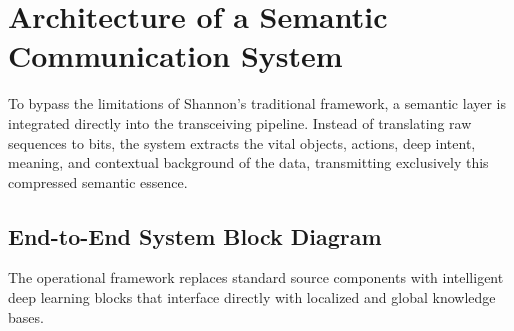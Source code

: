 \documentclass[10pt, conference]{IEEEtran}
\begin{document}
\section{\large \textbf{Architecture of a Semantic Communication System}}
To bypass the limitations of Shannon’s traditional framework, a semantic layer is integrated directly into the transceiving pipeline. Instead of translating raw sequences to bits, the system extracts the vital objects, actions, deep intent, meaning, and contextual background of the data, transmitting exclusively this compressed semantic essence.

\subsection{\textbf{End-to-End System Block Diagram}}
The operational framework replaces standard source components with intelligent deep learning blocks that interface directly with localized and global knowledge bases. 
\end{document}
